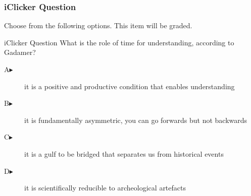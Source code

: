 \begin{frame}
  \frametitle{iClicker Question}
Choose from the following options. This item will be graded.
\begin{block}{iClicker Question}
What is the role of time for understanding, according to Gadamer?
\end{block}
\begin{description}
\item[A\hspace{.2in}$\blacktriangleright$] it is a positive and productive condition that enables understanding
\item[B\hspace{.2in}$\blacktriangleright$] it is fundamentally asymmetric, you can go forwards but not backwards
\item[C\hspace{.2in}$\blacktriangleright$] it is a gulf to be bridged that separates us from historical events
\item[D\hspace{.2in}$\blacktriangleright$] it is scientifically reducible to archeological artefacts
\end{description}
\end{frame}
